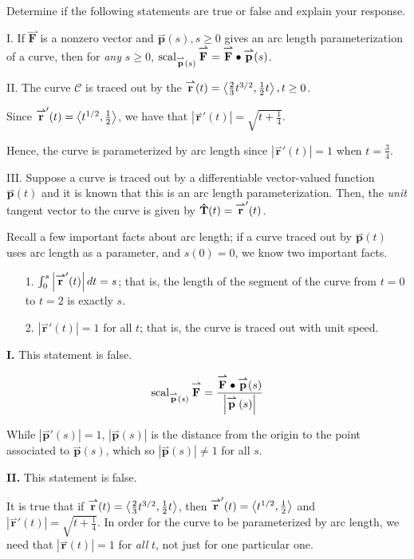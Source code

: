 \documentclass[noauthor,handout]{ximera}
\newcommand{\Magf}[2]{\left| \vec{#1}\left(#2\right) \right|}
\renewcommand{\vec}[1]{{\overset{\boldsymbol{\rightharpoonup}}{\mathbf{#1}}}}
\begin{document}
\begin{problem}
Determine if the following statements are true or false and explain your response.

I. If $\vec{F}$ is a nonzero vector and $\vec{p}(s), s \geq 0$ gives an arc length parameterization of a curve, then for \emph{any} $s\geq 0$, $\scal_{\vec{p}(s)}\vec{F} = \vec{F} \dotp \vec{p}(s)$.

II. The curve $\mathcal{C}$ is traced out by the $\vec{r}(t)=\vector{\frac{2}{3}t^{3/2}, \frac{1}{2}t}, t \geq0$.  

Since $\vec{r}'(t) = \vector{t^{1/2},\frac{1}{2}}$, we have that $\left|\vec{r}'(t)\right| = \sqrt{t+\frac{1}{4}}$. 

Hence, the curve is parameterized by arc length since $\left|\vec{r}'(t)\right|=1$ when $t=\frac{3}{4}$.

III. Suppose a curve is traced out by a differentiable vector-valued function $\vec{p}(t)$ and it is known that this is an arc length parameterization.  Then, the \emph{unit} tangent vector to the curve is given by $\uvec{T}(t) = \vec{r}'(t)$. 

\begin{freeResponse}
Recall a few important facts about arc length; if a curve traced out by $\vec{p}(t)$ uses arc length as a parameter, and $s(0)=0$, we know two important facts.

\begin{itemize}
\item[1.] $\int_0^s \left|\vec{r}'(t)\right| \d t = s$; that is, the length of the segment of the curve from $t=0$ to $t=2$ is exactly $s$.
\item[2.] $ \left|\vec{r}'(t)\right| = 1 $ for all $t$; that is, the curve is traced out with unit speed.
\end{itemize} 


\textbf{I.} This statement is false.

\[ \scal_{\vec{p}(s)}\vec{F} = \frac{ \vec{F} \dotp \vec{p}(s)}{\Magf{p}{s}} \]

While $\left|\vec{p}'(s)\right| = 1$,  $\Magf{p}{s}$ is the distance from the origin to the point associated to $\vec{p}(s)$, which so $\Magf{p}{s} \neq 1$ for all $s$.

\textbf{II.} This statement is false.  

It is true that if $\vec{r}(t)=\vector{\frac{2}{3}t^{3/2}, \frac{1}{2}t}$, then $\vec{r}'(t) = \vector{t^{1/2},\frac{1}{2}}$ and $\left|\vec{r}'(t)\right| = \sqrt{t+\frac{1}{4}}$.  In order for the curve to be parameterized by arc length, we need that $\Magf{r}{t} = 1 $ for \emph{all} $t$, not just for one particular one.


\end{freeResponse}
\end{problem}
\end{document}
